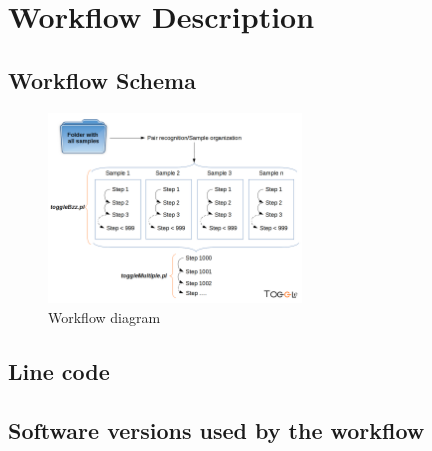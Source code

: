 \documentclass[a4paper]{article}
\begin{document}





\tableofcontents

\newpage




\section{Workflow Description}

\subsection{Workflow Schema}

\begin{figure}[ht]
\centering
\includegraphics[width=0.6\textwidth]{togglePipeline.png}
\caption{\label{fig:worflow}Workflow diagram}
\end{figure}

\subsection{Line code}




\subsection{Software versions used by the workflow}


\end{document}
